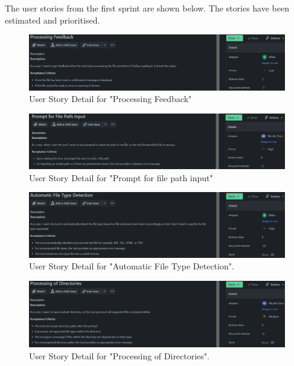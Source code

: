 The user stories from the first sprint are shown below. The stories have been estimated and prioritised.

\begin{figure}[h!]
    \centering
    \includegraphics[width=1\textwidth]{pictures/sprint_1_userstory_1}
    \caption{User Story Detail for "Processing Feedback"}
    \label{fig:sprint_1_userstory_1}
\end{figure}
\begin{figure}[h!]
    \centering
    \includegraphics[width=1\textwidth]{pictures/sprint_1_userstory_2}
    \caption{User Story Detail for "Prompt for file path input"}
    \label{fig:sprint_1_userstory_2}
\end{figure}
\begin{figure}[h!]
    \centering
    \includegraphics[width=1\textwidth]{pictures/sprint_1_userstory_3}
    \caption{User Story Detail for "Automatic File Type Detection".}
    \label{fig:sprint_1_userstory_3}
\end{figure}
\begin{figure}[h!]
    \centering
    \includegraphics[width=1\textwidth]{pictures/sprint_1_userstory_4}
    \caption{User Story Detail for "Processing of Directories".}
    \label{fig:sprint_1_userstory_4}
\end{figure}
\clearpage

